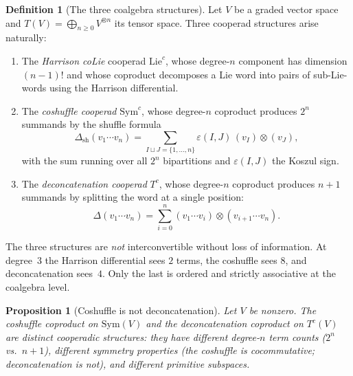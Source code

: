 \documentclass[11pt,reqno]{amsart}
\newtheorem{proposition}[theorem]{Proposition}
\theoremstyle{definition}
\newtheorem{definition}[theorem]{Definition}
\theoremstyle{remark}
\newcommand{\Sym}{\mathrm{Sym}}
\newcommand{\Lie}{\mathrm{Lie}}
\numberwithin{equation}{section}
\begin{document}
\begin{definition}[The three coalgebra structures]
\label{def:three-coalgebras}
Let $V$ be a graded vector space and
$T(V) = \bigoplus_{n \geq 0} V^{\otimes n}$ its tensor space.
Three cooperad structures arise naturally:
\begin{enumerate}[label=(\roman*)]
\item The \emph{Harrison coLie} cooperad $\Lie^c$, whose
  degree-$n$ component has dimension $(n-1)!$ and whose
  coproduct decomposes a Lie word into pairs of sub-Lie-words
  using the Harrison differential.

\item The \emph{coshuffle cooperad} $\Sym^c$, whose degree-$n$
  coproduct produces $2^n$ summands by the shuffle formula
  \begin{equation}\label{eq:coshuffle}
    \Delta_{\mathrm{sh}}(v_1 \cdots v_n)
    = \sum_{I \sqcup J = \{1,\ldots,n\}}
      \varepsilon(I,J)\, (v_I) \otimes (v_J),
  \end{equation}
  with the sum running over all $2^n$ bipartitions and
  $\varepsilon(I,J)$ the Koszul sign.

\item The \emph{deconcatenation cooperad} $T^c$, whose
  degree-$n$ coproduct produces $n+1$ summands by splitting
  the word at a single position:
  \begin{equation}\label{eq:deconc}
    \Delta(v_1 \cdots v_n)
    = \sum_{i=0}^{n}
      (v_1 \cdots v_i) \otimes (v_{i+1} \cdots v_n).
  \end{equation}
\end{enumerate}
\end{definition}

The three structures are \emph{not} interconvertible without loss
of information. At degree~$3$ the Harrison differential sees $2$
terms, the coshuffle sees $8$, and deconcatenation sees~$4$. Only
the last is ordered and strictly associative at the coalgebra level.

\begin{proposition}[Coshuffle is not deconcatenation]
\label{prop:coshuffle-neq-deconc}
Let $V$ be nonzero. The coshuffle coproduct on $\Sym(V)$ and the
deconcatenation coproduct on $T^c(V)$ are distinct cooperadic
structures: they have different degree-$n$ term counts ($2^n$ vs.\
$n+1$), different symmetry properties (the coshuffle is
cocommutative; deconcatenation is not), and different primitive
subspaces.
\end{proposition}
\end{document}
